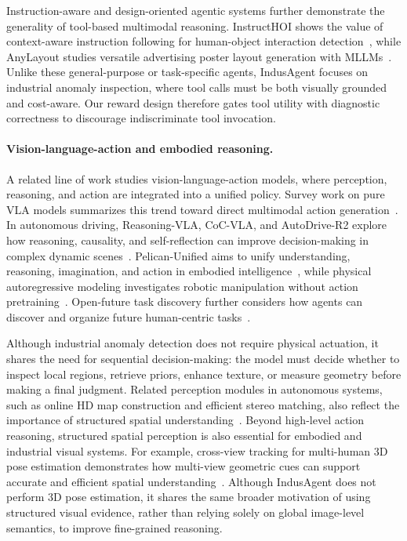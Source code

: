 \documentclass{article}
\begin{document}
{Instruction-aware and design-oriented agentic systems further demonstrate the generality of tool-based multimodal reasoning. InstructHOI shows the value of context-aware instruction following for human-object interaction detection~\citep{luoinstructhoi}, while AnyLayout studies versatile advertising poster layout generation with MLLMs~\citep{anonymous2025anylayout}. Unlike these general-purpose or task-specific agents, IndusAgent focuses on industrial anomaly inspection, where tool calls must be both visually grounded and cost-aware. Our reward design therefore gates tool utility with diagnostic correctness to discourage indiscriminate tool invocation.

\paragraph{Vision-language-action and embodied reasoning.}
A related line of work studies vision-language-action models, where perception, reasoning, and action are integrated into a unified policy. Survey work on pure VLA models summarizes this trend toward direct multimodal action generation~\citep{zhang2025pure}. In autonomous driving, Reasoning-VLA, CoC-VLA, and AutoDrive-R2 explore how reasoning, causality, and self-reflection can improve decision-making in complex dynamic scenes~\citep{zhang2025reasoning, zhang2026coc, yuan2025autodrive}. Pelican-Unified aims to unify understanding, reasoning, imagination, and action in embodied intelligence~\citep{zhang2026pelican}, while physical autoregressive modeling investigates robotic manipulation without action pretraining~\citep{song2025physical}. Open-future task discovery further considers how agents can discover and organize future human-centric tasks~\citep{song2026human}. 

Although industrial anomaly detection does not require physical actuation, it shares the need for sequential decision-making: the model must decide whether to inspect local regions, retrieve priors, enhance texture, or measure geometry before making a final judgment. Related perception modules in autonomous systems, such as online HD map construction and efficient stereo matching, also reflect the importance of structured spatial understanding~\citep{zhang2025mapexpert, zhang2023ehss}. Beyond high-level action reasoning, structured spatial perception is also essential for embodied and industrial visual systems. For example, cross-view tracking for multi-human 3D pose estimation demonstrates how multi-view geometric cues can support accurate and efficient spatial understanding~\citep{chen2020cross}. Although IndusAgent does not perform 3D pose estimation, it shares the same broader motivation of using structured visual evidence, rather than relying solely on global image-level semantics, to improve fine-grained reasoning.

}
\end{document}
